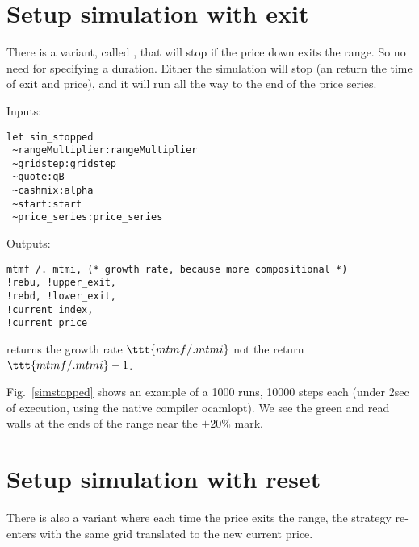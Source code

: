 \documentclass[oneside]{article}
\begin{document}

\section{Setup simulation with exit}
There is a variant, called , that will stop if the price down exits the range. So no need for specifying a duration.
Either the simulation will stop (an return the time of exit and price), and it will run all the way to the
end of the price series.

Inputs:
\begin{verbatim}
let sim_stopped 
 ~rangeMultiplier:rangeMultiplier 
 ~gridstep:gridstep 
 ~quote:qB 
 ~cashmix:alpha
 ~start:start 
 ~price_series:price_series 
\end{verbatim}
 
Outputs:
\begin{verbatim}
mtmf /. mtmi, (* growth rate, because more compositional *)
!rebu, !upper_exit,
!rebd, !lower_exit, 
!current_index,
!current_price
\end{verbatim}


\NB[1]  returns the growth rate $\ttt{mtmf /. mtmi}$ not the return $\ttt{mtmf /. mtmi} - 1$.

Fig.~\ref{simstopped} shows an example of a 1000 runs, 10000 steps each (under 2sec of execution, using the native compiler ocamlopt). We see the green and read walls at the ends of the range near the $\pm20\%$ mark.


\section{Setup simulation with reset}
There is also a  variant where each time the price exits the range,
the strategy re-enters with the same grid translated to the new current price.
\end{document}
